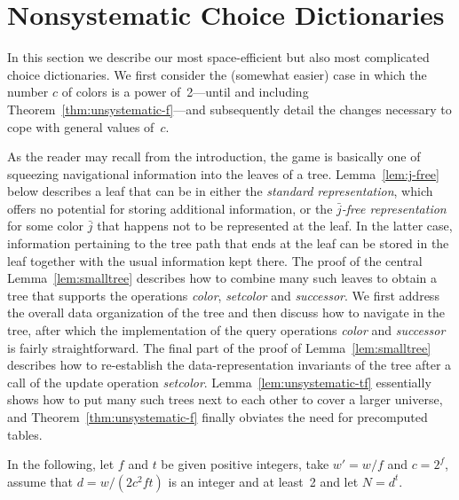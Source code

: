 \documentclass[envcountsame,envcountsect,undated,nolinenumbers]{lnthi}
\def\Tvn#1{\hbox{\textit{#1\/}}}
\def\jj{{\bar j}}
\begin{document}
\section{Nonsystematic Choice Dictionaries}
\label{sec:nonsystematic}

In this section we describe our most space-efficient
but also most complicated choice dictionaries.
We first consider the (somewhat easier) case
in which the number $c$ of colors is a power of~2---until
and including Theorem~\ref{thm:unsystematic-f}---and
subsequently detail the changes necessary to cope
with general values of~$c$.

As the reader may recall from the introduction,
the game is basically one of squeezing navigational
information into the leaves of a tree.
Lemma~\ref{lem:j-free} below describes a leaf that
can be in either the \emph{standard representation},
which offers no potential for storing
additional information,
or the \emph{$\jj$-free representation} for some
color $\jj$ that happens not to be represented
at the leaf.
In the latter case, information pertaining to the
tree path that ends at the leaf can be stored
in the leaf together with the usual information
kept there.
The proof of the central Lemma~\ref{lem:smalltree} describes how
to combine many such leaves to obtain a
tree that supports the operations \Tvn{color},
\Tvn{setcolor} and \Tvn{successor}.
We first address the overall data organization of the tree
and then discuss how to navigate in the tree,
after which the implementation of the query operations
\Tvn{color} and \Tvn{successor} is fairly
straightforward.
The final part of the proof of
Lemma~\ref{lem:smalltree} describes how to
re-establish the data-representation invariants
of the tree
after a call of the update operation \Tvn{setcolor}.
Lemma~\ref{lem:unsystematic-tf} essentially shows
how to put many such trees next to each other
to cover a larger universe, and
Theorem~\ref{thm:unsystematic-f} finally obviates
the need for precomputed tables.

In the following, let $f$ and $t$ be given
positive integers, take $w'={w/f}$ and $c=2^f$, assume
that $d={w/{(2 c^2 f t)}}$ is an integer and at
least~2 and let $N=d^t$.
\end{document}
